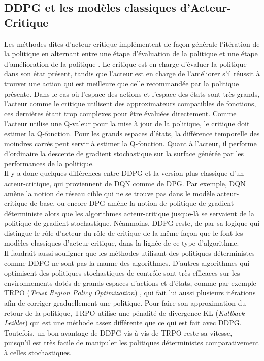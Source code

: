 \documentclass[letterpaper, french]{article}
\begin{document}
\subsection{DDPG et les modèles classiques d'Acteur-Critique}
Les méthodes dites d'acteur-critique implémentent de façon générale l'itération de la politique en alternant entre une étape d'évaluation de la politique et une étape d'amélioration de la politique \cite{LectureActor-critic}. Le critique est en charge d'évaluer la politique dans son état présent, tandis que l'acteur est en charge de l'améliorer s'il réussit à trouver une action qui est meilleure que celle recommandée par la politique présente. Dans le cas où l'espace des actions et l'espace des états sont très grands, l'acteur comme le critique utilisent des approximateurs compatibles de fonctions, ces dernières étant trop complexes pour être évaluées directement. Comme l'acteur utilise une Q-valeur pour la mise à jour de la politique, le critique doit estimer la Q-fonction. Pour les grands espaces d'états, la différence temporelle des moindres carrés peut servir à estimer la Q-fonction. Quant à l'acteur, il performe d'ordinaire la descente de gradient stochastique sur la surface générée par les performances de la politique. \\

Il y a donc quelques différences entre DDPG et la version plus classique d'un acteur-critique, qui proviennent de DQN comme de DPG. Par exemple, DQN amène la notion de réseau cible qui ne se trouve pas dans le modèle acteur-critique de base, ou encore DPG amène la notion de politique de gradient déterministe alors que les algorithmes acteur-critique jusque-là se servaient de la politique de gradient stochastique. Néanmoins, DDPG reste, de par sa logique qui distingue le rôle d'acteur du rôle de critique de la même façon que le font les modèles classiques d'acteur-critique, dans la lignée de ce type d'algorithme.\\

Il faudrait aussi souligner que les méthodes utilisant des politiques déterministes comme DDPG ne sont pas la manne des algorithmes. D'autres algorithmes qui optimisent des politiques stochastiques de contrôle sont très efficaces sur les environnements dotés de grands espaces d'actions et d'états, comme par exemple TRPO (\textit{Trust Region Policy Optimization}) \cite{TRPO}, qui fait lui aussi plusieurs itérations afin de corriger graduellement une politique. Pour faire son approximation du retour de la politique, TRPO utilise une pénalité de divergence KL (\textit{Kullback-Leibler}) qui est une méthode assez différente que ce qui est fait avec DDPG. Toutefois, un bon avantage de DDPG vis-à-vis de TRPO reste sa vitesse, puisqu'il est très facile de manipuler les politiques déterministes comparativement à celles stochastiques.
\end{document}
